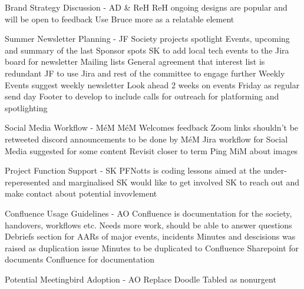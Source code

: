 \documentclass[11pt]{meetingmins}
\begin{document}
\begin{items}
  \item 
  Brand Strategy Discussion - AD \& ReH
    \subitem
    ReH ongoing designs are popular and will be open to feedback
    \subitem
    Use Bruce more as a relatable element

  \item 
  Summer Newsletter Planning - JF
    \subitem
    Society projects spotlight
    \subitem
    Events, upcoming and summary of the last
    \subitem
    Sponsor spots
    \subitem
    SK to add local tech events to the Jira board for newsletter
    \subitem
    Mailing lists
      \subsubitem
      General agreement that interest list is redundant
    \subitem
    JF to use Jira and rest of the committee to engage further
    \subitem
    Weekly Events suggest weekly newsletter
      \subitem
      Look ahead 2 weeks on events
      \subitem
      Friday as regular send day
    \subitem
    Footer to develop to include calls for outreach for platforming and spotlighting

  \item 
  Social Media Workflow - M\'eM
    \subitem
    M\'eM Welcomes feedback
    \subitem
    Zoom links shouldn't be retweeted
    \subitem
    discord announcements to be done by M\'eM
    \subitem
    Jira workflow for Social Media suggested for some content
      \subsubitem
      Revisit closer to term
    \subitem
    Ping MiM about images

  \item 
  Project Function Support - SK
    \subitem
    PFNotts is coding lessons aimed at the under-reperesented and marginalised
    \subitem
    SK would like to get involved
    \subitem
    SK to reach out and make contact about potential invovlement


  \item 
  Confluence Usage Guidelines - AO
    \subitem
    Confluence is documentation for the society, handovers, workflows etc.
    \subitem
    Needs more work, should be able to answer questions
    \subitem
    Debriefs section for AARs of major events, incidents
    \subitem
    Minutes and descisions was raised as duplication issue
      \subsubitem
      Minutes to be duplicated to Confluence
    \subitem
    Sharepoint for documents
    \subitem
    Confluence for documentation

  \item 
  Potential Meetingbird Adoption - AO
    \subitem
    Replace Doodle
    \subitem
    Tabled as nonurgent

\end{items}
\end{document}
